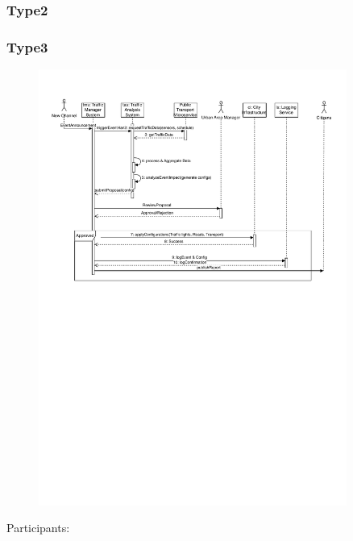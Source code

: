 \documentclass[11.5pt]{article}
\begin{document}
    \subsubsection{Type2}

    \newpage
    
    \subsubsection{Type3}
    \begin{figure}[htbp]
        \centering
        \includegraphics[width=0.9\textwidth]{figures/sequence-diagram-type3.pdf}
    \end{figure}
    \par{Participants:}
\end{document}
